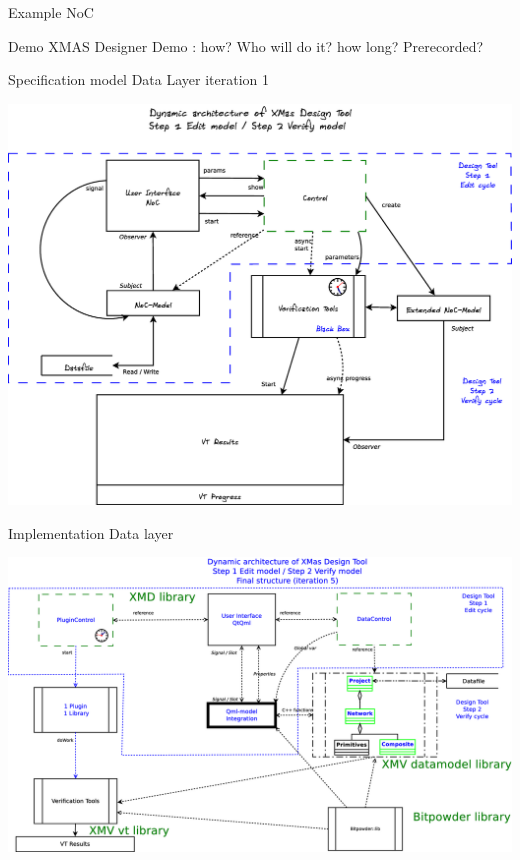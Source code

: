\documentclass[11pt]{beamer}
\begin{document}
\begin{frame}{Example NoC}

\end{frame}

\begin{frame}{Demo XMAS Designer}
	Demo : how? Who will do it? how long? Prerecorded?
\end{frame}

\begin{frame}{Specification model Data Layer iteration 1}

	\includegraphics[width=.95\linewidth]{pictures/1c-architecture-dynamic-1}

\end{frame}

\begin{frame}{Implementation Data layer}

	\includegraphics[width=.95\linewidth]{pictures/1c-architecture-dynamic-2}

\end{frame}
\end{document}
